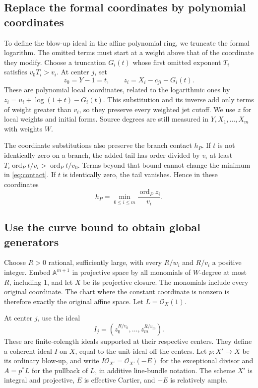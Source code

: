 \documentclass[11pt]{article}
\theoremstyle{definition}
\theoremstyle{remark}
\newcommand{\ord}{\operatorname{ord}}
\newcommand{\OO}{\mathcal O}
\numberwithin{equation}{section}
\begin{document}
\subsection{Replace the formal coordinates by polynomial coordinates}
To define the blow-up ideal in the affine polynomial ring, we truncate
the formal logarithm. The omitted terms must start at a weight above
that of the coordinate they modify. Choose a truncation \(G_i(t)\)
whose first omitted exponent \(T_i\) satisfies \(v_0T_i>v_i\).
At center \(j\), set
\[
 z_0=Y-1=t,\qquad z_i=X_i-c_{ji}-G_i(t).
\]
These are polynomial local coordinates, related to the logarithmic
ones by \(z_i=u_i+\log(1+t)-G_i(t)\). This substitution and its
inverse add only terms of weight greater than \(v_i\), so they
preserve every weighted jet cutoff. We use \(z\) for local weights and
initial forms. Source degrees are still measured in \(Y,X_1,\ldots,X_m\)
with weights \(W\).

The coordinate substitutions also preserve the branch contact \(h_P\).
If \(t\) is not
identically zero on a branch, the added tail has order divided by
\(v_i\) at least \(T_i\ord_Pt/v_i>\ord_Pt/v_0\). Terms beyond
that bound cannot change the minimum in \eqref{eq:contact}. If \(t\)
is identically zero, the tail vanishes. Hence in these coordinates
\begin{equation}\label{eq:algebraiccontact}
 h_P=\min_{0\le i\le m}\frac{\ord_Pz_i}{v_i}.
\end{equation}

\subsection{Use the curve bound to obtain global generators}
Choose \(R>0\) rational, sufficiently large, with every \(R/w_i\)
and \(R/v_i\) a positive integer. Embed \(\mathbb A^{m+1}\) in
projective space by all monomials of \(W\)-degree at most \(R\),
including 1, and let \(X\) be its projective closure. The monomials
include every original coordinate. The chart where the constant
coordinate is nonzero is therefore exactly the original affine space.
Let \(L=\OO_X(1)\).

At center \(j\), use the ideal
\[
 I_j=(z_0^{R/v_0},\ldots,z_m^{R/v_m}).
\]
These are finite-colength ideals supported at their respective centers.
They define a coherent ideal \(I\) on \(X\), equal to the unit ideal
off the centers. Let \(p:X'\to X\) be its ordinary blow-up, and write
\(I\OO_{X'}=\OO_{X'}(-E)\) for the exceptional divisor and
\(A=p^*L\) for the pullback of \(L\), in additive line-bundle
notation. The scheme \(X'\) is integral and projective, \(E\) is
effective Cartier, and \(-E\) is relatively ample.
\end{document}
